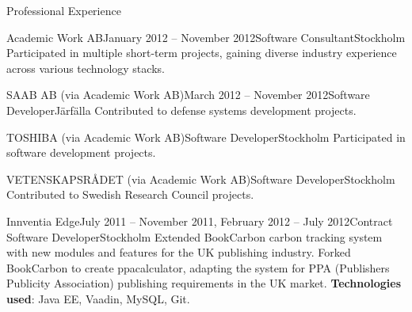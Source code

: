\documentclass{resume}
\begin{document}
\begin{rSection}{Professional Experience}
\begin{rSubsection}{Academic Work AB}{January 2012 -- November 2012}{Software Consultant}{Stockholm}
\bItem Participated in multiple short-term projects, gaining diverse industry experience across various technology stacks.
\end{rSubsection}

\begin{rClientSubsection}{SAAB AB (via Academic Work AB)}{March 2012 -- November 2012}{Software Developer}{Järfälla}
\bItem Contributed to defense systems development projects.
\end{rClientSubsection}

\begin{rClientSubsection}{TOSHIBA (via Academic Work AB)}{}{Software Developer}{Stockholm}
\bItem Participated in software development projects.
\end{rClientSubsection}

\begin{rClientSubsection}{VETENSKAPSRÅDET (via Academic Work AB)}{}{Software Developer}{Stockholm}
\bItem Contributed to Swedish Research Council projects.
\end{rClientSubsection}

\begin{rSubsection}{Innventia Edge}{July 2011 -- November 2011, February 2012 -- July 2012}{Contract Software Developer}{Stockholm}
\bItem Extended BookCarbon carbon tracking system with new modules and features for the UK publishing industry.
\bItem Forked BookCarbon to create ppacalculator, adapting the system for PPA (Publishers Publicity Association) publishing requirements in the UK market.
\bItem \textbf{Technologies used}: Java EE, Vaadin, MySQL, Git.
\end{rSubsection}
\end{rSection}
\end{document}
